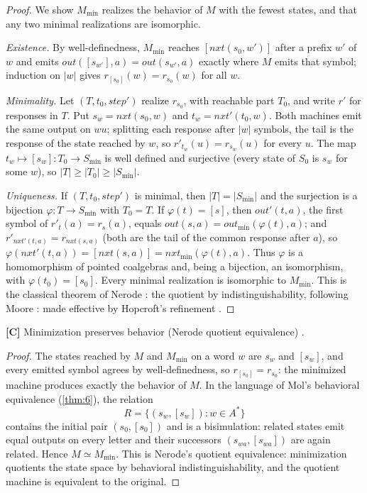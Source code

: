 \begin{proof}
We show $M_{\min}$ realizes the behavior of $M$ with the fewest states, and that any
two minimal realizations are isomorphic.

\emph{Existence.} By well-definedness, $M_{\min}$ reaches $[\mathit{nxt} (s_0, w')]$
after a prefix $w'$ of $w$ and emits $\mathit{out} ([s_{w'}], a) = \mathit{out} (s_{w'}, a)$
exactly where $M$ emits that symbol; induction on $|w|$ gives $r_{[s_0]} (w) = r_{s_0} (w)$
for all $w$.

\emph{Minimality.} Let $(T, t_0, \mathit{step}')$ realize $r_{s_0}$, with reachable
part $T_0$, and write $r'$ for responses in $T$. Put $s_w = \mathit{nxt} (s_0, w)$ and
$t_w = \mathit{nxt}'(t_0, w)$. Both machines emit the same output on $wu$; splitting
each response after $|w|$ symbols, the tail is the response of the state reached by
$w$, so $r'_{t_w} (u) = r_{s_w} (u)$ for every $u$. The map $t_w \mapsto [s_w] \colon
T_0 \to S_{\min}$ is well defined and surjective (every state of $S_0$ is $s_w$ for
some $w$), so $|T| \geq |T_0| \geq |S_{\min}|$.

\emph{Uniqueness.} If $(T, t_0, \mathit{step}')$ is minimal, then $|T| = |S_{\min}|$
and the surjection is a bijection $\varphi \colon T \to S_{\min}$ with $T_0 = T$. If
$\varphi (t) = [s]$, then $\mathit{out}'(t,a)$, the first symbol of $r'_t (a) = r_s (a)$,
equals $\mathit{out} (s,a) = \mathit{out}_{\min} (\varphi (t), a)$; and
$r'_{\mathit{nxt}'(t,a)} = r_{\mathit{nxt} (s,a)}$ (both are the tail of the common
response after $a$), so $\varphi (\mathit{nxt}'(t,a)) = [\mathit{nxt} (s,a)] =
\mathit{nxt}_{\min} (\varphi (t), a)$. Thus $\varphi$ is a homomorphism of pointed
coalgebras and, being a bijection, an isomorphism, with $\varphi (t_0) = [s_0]$. Every
minimal realization is isomorphic to $M_{\min}$. This is the classical theorem of
Nerode \citep{nerode}: the quotient by indistinguishability, following Moore
\citep{moore}: made effective by Hopcroft's refinement \citep{hopcroft}.
\end{proof}

\begin{theorem}\label{thm:39}
\textbf{[C]} Minimization preserves behavior (Nerode quotient equivalence)
\citep{nerode}.
\end{theorem}

\begin{proof}
The states reached by $M$ and $M_{\min}$ on a word $w$ are $s_w$ and $[s_w]$, and every
emitted symbol agrees by well-definedness, so $r_{[s_0]} = r_{s_0}$: the minimized
machine produces exactly the behavior of $M$. In the language of Mol's behavioral
equivalence (\autoref{thm:6}), the relation
\[
R = \{ (s_w, [s_w]) : w \in A^* \}
\]
contains the initial pair $(s_0, [s_0])$ and is a bisimulation: related states emit
equal outputs on every letter and their successors $(s_{wa}, [s_{wa}])$ are again
related. Hence $M \simeq M_{\min}$. This is Nerode's quotient equivalence: minimization
quotients the state space by behavioral indistinguishability, and the quotient machine
is equivalent to the original.
\end{proof}

